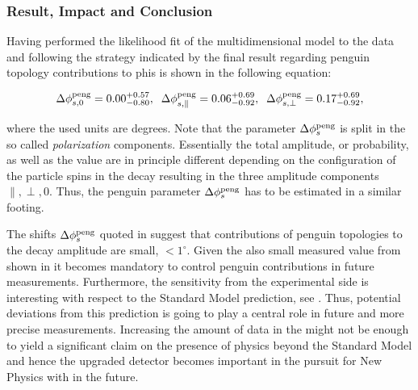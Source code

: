 \subsubsection{Result, Impact and Conclusion}

Having performed the likelihood fit of the multidimensional model to the data and
following the strategy indicated by \cite{Fleischer:1999zi,Faller:2008gt,DeBruyn:2014oga,DeBruyn-thesis}
the final result regarding penguin topology contributions to phis is shown in the following equation:

\begin{equation}
\label{app_delta_phis_result}
  \Delta\phi^{\rm peng}_{s,{0}}         = 0.00 ^{+0.57}_{-0.80}, \;\;
  \Delta\phi^{\rm peng}_{s,{\parallel}} = 0.06 ^{+0.69}_{-0.92}, \;\;
  \Delta\phi^{\rm peng}_{s,{\perp}}     = 0.17 ^{+0.69}_{-0.92},
\end{equation}


\noindent where the used units are degrees. Note that the parameter $\Delta\phi_{s}^{\tiny\text{peng}}$ is split in the so called {\it polarization}
components. Essentially the total \BsJpsiPhi amplitude, or probability, as well as the \phis value
are in principle different depending on the configuration of the particle spins in the \BsJpsiPhi
decay resulting in the three amplitude components $\parallel,\perp,0$. Thus, the penguin parameter
$\Delta\phi_{s}^{\tiny\text{peng}}$ has to be estimated in a similar footing.

The shifts $\Delta\phi_{s}^{\tiny\text{peng}}$ quoted in 
suggest that contributions of penguin topologies to the \BsJpsiPhi decay amplitude are
small, $<1^\circ$. Given the also small \phis measured value from \lhcb shown in 
it becomes mandatory to control penguin contributions in future \phis measurements.
Furthermore, the sensitivity from the experimental side is interesting with respect to
the Standard Model prediction, see . Thus, potential deviations from this
prediction is going to play a central role in future and more precise \phis measurements.
Increasing the amount of data in the \lhc \runtwo might not be enough to yield
a significant claim on the presence of physics beyond the Standard Model and hence
the upgraded \lhcb detector becomes important in the pursuit for New Physics with \phis in the future.

